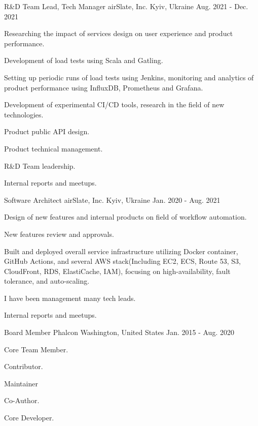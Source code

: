 
\begin{cventries}

  \cventry
    {R\&D Team Lead, Tech Manager}
    {airSlate, Inc.}
    {Kyiv, Ukraine}
    {Aug. 2021 - Dec. 2021}
    {
      \begin{cvitems}
        \item {Researching the impact of services design on user experience and product performance.}
        \item {Development of load tests using Scala and Gatling.}
        \item {Setting up periodic runs of load tests using Jenkins, monitoring and analytics of product performance using InfluxDB, Prometheus and Grafana.}
        \item {Development of experimental CI/CD tools, research in the field of new technologies.}
        \item {Product public API design.}
        \item {Product technical management.}
        \item {R\&D Team leadership.}
        \item {Internal reports and meetups.}
      \end{cvitems}
    }

  \cventry
    {Software Architect}
    {airSlate, Inc.}
    {Kyiv, Ukraine}
    {Jan. 2020 - Aug. 2021}
    {
      \begin{cvitems}
        \item {Design of new features and internal products on field of workflow automation.}
        \item {New features review and approvals.}
        \item {Built and deployed overall service infrastructure utilizing Docker container, GitHub Actions, and several AWS stack(Including EC2, ECS, Route 53, S3, CloudFront, RDS, ElastiCache, IAM), focusing on high-availability, fault tolerance, and auto-scaling.}
        \item {I have been management many tech leads.}
        \item {Internal reports and meetups.}
      \end{cvitems}
    }

  \cventry
    {Board Member}
    {Phalcon}
    {Washington, United States}
    {Jan. 2015 - Aug. 2020}
    {
      \begin{cvitems}
        \item {Core Team Member.}
        \item {Contributor.}
        \item {Maintainer}
        \item {Co-Author.}
        \item {Core Developer.}
      \end{cvitems}
    }


\end{cventries}
